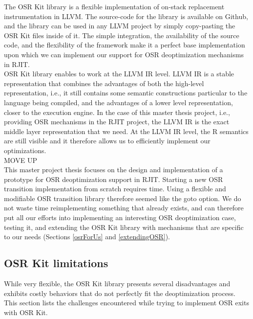 The OSR Kit library\cite{OSRKit} is a flexible implementation of on-stack replacement instrumentation in LLVM.
The source-code for the library is available on Github\cite{OSRKitGit}, and the library can be used in any LLVM project by simply copy-pasting the OSR Kit files inside of it.
The simple integration, the availability of the source code, and the flexibility of the framework make it a perfect base implementation upon which we can implement our support for OSR deoptimization mechanisms in RJIT.\\

OSR Kit library enables to work at the LLVM IR level.
LLVM IR is a stable representation that combines the advantages of both the high-level representation, i.e., it still contains some semantic constructions particular to the language being compiled, and the advantages of a lower level representation, closer to the execution engine.
In the case of this master thesis project, i.e., providing OSR mechanisms in the RJIT project, the LLVM IR is the exact middle layer representation that we need. 
At the LLVM IR level, the R semantics are still visible and it therefore allows us to efficiently implement our optimizations.\\

MOVE UP\\

This master project thesis focuses on the design and implementation of a prototype for OSR deoptimization support in RJIT.
Starting a new OSR transition implementation from scratch requires time.
Using a flexible and modifiable OSR transition library therefore seemed like the goto option.
We do not waste time reimplementing something that already exists, and can therefore put all our efforts into implementing an interesting OSR deoptimization case, testing it, and extending the OSR Kit library with mechanisms that are specific to our needs (Sections \ref{osrForUs} and \ref{extendingOSR}).\\

\subsection{OSR Kit limitations}\label{osrkitlimitations}

While very flexible, the OSR Kit\cite{OSRKit} library presents several disadvantages and exhibits costly behaviors that do not perfectly fit the deoptimization process.
This section lists the challenges encountered while trying to implement OSR exits with OSR Kit.\\

